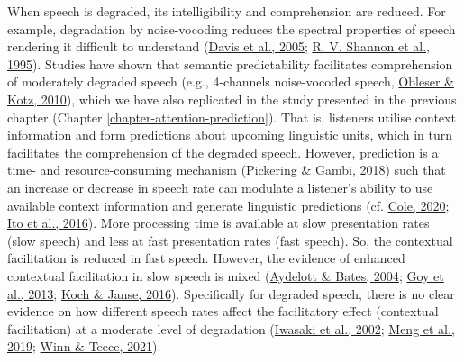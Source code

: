 \documentclass[a4paper, nobind]{templates/ociamthesis}
\begin{document}
When speech is degraded, its intelligibility and comprehension are reduced.
For example, degradation by noise-vocoding reduces the spectral properties of speech rendering it difficult to understand (\protect\hyperlink{ref-Davis2005}{Davis et al., 2005}; \protect\hyperlink{ref-Shannon1995}{R. V. Shannon et al., 1995}).
Studies have shown that semantic predictability facilitates comprehension of moderately degraded speech (e.g., 4-channels noise-vocoded speech, \protect\hyperlink{ref-Obleser2010}{Obleser \& Kotz, 2010}),
which we have also replicated in the study presented in the previous chapter (Chapter \ref{chapter-attention-prediction}).
That is, listeners utilise context information and form predictions about upcoming linguistic units,
which in turn facilitates the comprehension of the degraded speech.
However, prediction is a time- and resource-consuming mechanism (\protect\hyperlink{ref-Pickering2018}{Pickering \& Gambi, 2018}) such that an increase or decrease in speech rate can modulate a listener's ability to use available context information and generate linguistic predictions (cf. \protect\hyperlink{ref-Cole2020}{Cole, 2020}; \protect\hyperlink{ref-Ito2016}{Ito et al., 2016}).
More processing time is available at slow presentation rates (slow speech) and less at fast presentation rates (fast speech).
So, the contextual facilitation is reduced in fast speech.
However, the evidence of enhanced contextual facilitation in slow speech is mixed (\protect\hyperlink{ref-Aydelott2004}{Aydelott \& Bates, 2004}; \protect\hyperlink{ref-Goy2013}{Goy et al., 2013}; \protect\hyperlink{ref-Koch2016}{Koch \& Janse, 2016}).
Specifically for degraded speech, there is no clear evidence on how different speech rates affect the facilitatory effect (contextual facilitation) at a moderate level of degradation (\protect\hyperlink{ref-Iwasaki2002}{Iwasaki et al., 2002}; \protect\hyperlink{ref-Meng2019}{Meng et al., 2019}; \protect\hyperlink{ref-Winn2021}{Winn \& Teece, 2021}).
\end{document}
